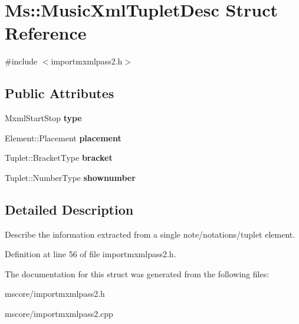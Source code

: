 \hypertarget{struct_ms_1_1_music_xml_tuplet_desc}{}\section{Ms\+:\+:Music\+Xml\+Tuplet\+Desc Struct Reference}
\label{struct_ms_1_1_music_xml_tuplet_desc}


{\ttfamily \#include $<$importmxmlpass2.\+h$>$}

\subsection*{Public Attributes}
\begin{DoxyCompactItemize}
\item 
\mbox{\label{struct_ms_1_1_music_xml_tuplet_desc_aff3b78f42730a94cddc50da1e8d0ba02}} 
Mxml\+Start\+Stop {\bfseries type}
\item 
\mbox{\label{struct_ms_1_1_music_xml_tuplet_desc_af7680b8f314b57fcf78a6e1cce739450}} 
Element\+::\+Placement {\bfseries placement}
\item 
\mbox{\label{struct_ms_1_1_music_xml_tuplet_desc_a2ec334b568ad55804e010448bf7472e6}} 
Tuplet\+::\+Bracket\+Type {\bfseries bracket}
\item 
\mbox{\label{struct_ms_1_1_music_xml_tuplet_desc_aa81ec92bed44cefd4d7b25857d062be8}} 
Tuplet\+::\+Number\+Type {\bfseries shownumber}
\end{DoxyCompactItemize}


\subsection{Detailed Description}
Describe the information extracted from a single note/notations/tuplet element. 

Definition at line 56 of file importmxmlpass2.\+h.



The documentation for this struct was generated from the following files\+:\begin{DoxyCompactItemize}
\item 
mscore/importmxmlpass2.\+h\item 
mscore/importmxmlpass2.\+cpp\end{DoxyCompactItemize}

